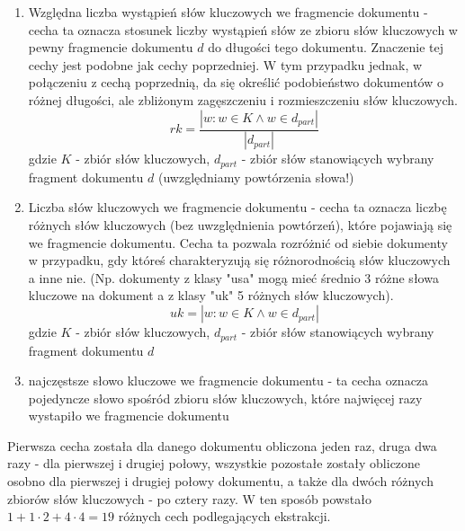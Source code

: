 \documentclass{classrep}
\begin{document}
{{{\begin{enumerate}
                    \item Względna liczba wystąpień słów kluczowych we fragmencie dokumentu - cecha ta oznacza stosunek liczby wystąpień słów ze zbioru słów kluczowych
                    w pewny fragmencie dokumentu $d$ do długości tego dokumentu. Znaczenie tej cechy jest podobne jak cechy poprzedniej. W tym przypadku
                    jednak, w połączeniu z cechą poprzednią, da się określić podobieństwo dokumentów o różnej długości, ale zbliżonym zagęszczeniu i
                    rozmieszczeniu słów kluczowych.
                    \begin{equation}
                        rk = \frac{|{w: w \in K \land w \in d_{part}}|}{|d_{part}|}
                    \end{equation}
                    gdzie $K$ - zbiór słów kluczowych, $d_{part}$ - zbiór słów stanowiących wybrany fragment dokumentu $d$ (uwzględniamy powtórzenia słowa!)

                    \item Liczba słów kluczowych we fragmencie dokumentu - cecha ta oznacza liczbę różnych słów kluczowych (bez uwzględnienia powtórzeń), które
                    pojawiają się we fragmencie dokumentu. Cecha ta pozwala rozróżnić od siebie dokumenty w przypadku, gdy któreś charakteryzują się różnorodnością
                    słów kluczowych a inne nie. (Np. dokumenty z klasy "usa" mogą mieć średnio 3 różne słowa kluczowe na dokument a z klasy "uk" 5 różnych słów
                    kluczowych).
                    \begin{equation}
                        uk = |{w: w \in K \land w \in d_{part}}|
                    \end{equation}
                    gdzie $K$ - zbiór słów kluczowych, $d_{part}$ - zbiór słów stanowiących wybrany fragment dokumentu $d$

                    \item najczęstsze słowo kluczowe we fragmencie dokumentu - ta cecha oznacza pojedyncze słowo spośród zbioru słów kluczowych, które najwięcej
                    razy wystapiło we fragmencie dokumentu
                \end{enumerate}

                Pierwsza cecha została dla danego dokumentu obliczona jeden raz, druga dwa razy - dla pierwszej i drugiej połowy, wszystkie pozostałe zostały
                obliczone osobno dla pierwszej i drugiej połowy dokumentu, a także dla dwóch różnych zbiorów słów kluczowych - po cztery razy. W ten sposób
                powstało $1 + 1 \cdot 2 + 4 \cdot 4 = 19$ różnych cech podlegających ekstrakcji.
            }
        }

}
\end{document}
